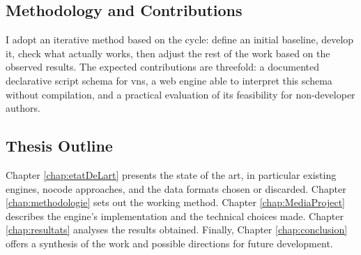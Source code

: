 \subsection{Methodology and Contributions}
I adopt an iterative method based on the  cycle: define an initial baseline, develop it, check what actually works, then adjust the rest of the work based on the observed results. The expected contributions are threefold: a documented declarative script \gls{schema} for \glspl{vn}, a web engine able to interpret this \gls{schema} without compilation, and a practical evaluation of its feasibility for non-developer authors.

\subsection{Thesis Outline}
Chapter \ref{chap:etatDeLart} presents the state of the art, in particular existing engines, \gls{nocode} approaches, and the data formats chosen or discarded. Chapter \ref{chap:methodologie} sets out the working method. Chapter \ref{chap:MediaProject} describes the engine's implementation and the technical choices made. Chapter \ref{chap:resultats} analyses the results obtained. Finally, Chapter \ref{chap:conclusion} offers a synthesis of the work and possible directions for future development.


